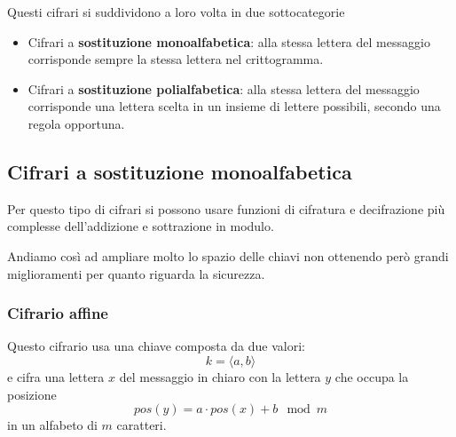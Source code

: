 Questi cifrari si suddividono a loro volta in due sottocategorie
\begin{itemize}
	\item Cifrari a \textbf{sostituzione monoalfabetica}: alla stessa lettera del messaggio corrisponde sempre la
	      stessa lettera nel crittogramma.
	\item Cifrari a \textbf{sostituzione polialfabetica}: alla stessa lettera del messaggio corrisponde una lettera
	      scelta in un insieme di lettere possibili, secondo una regola opportuna.
\end{itemize}

\subsection{Cifrari a sostituzione monoalfabetica}
Per questo tipo di cifrari si possono usare funzioni di cifratura e decifrazione pi\`u complesse dell'addizione e
sottrazione in modulo.

Andiamo cos\`i ad ampliare molto lo spazio delle chiavi non ottenendo per\`o grandi  miglioramenti per quanto
riguarda la sicurezza.

\subsubsection{Cifrario affine}
Questo cifrario usa una chiave composta da due valori:
\[ k = \langle a, b \rangle \]
e cifra una lettera $x$ del messaggio in chiaro con la lettera $y$ che occupa la posizione
\[ pos(y) = a \cdot pos(x) + b \mod{m} \]
in un alfabeto di $m$ caratteri.

